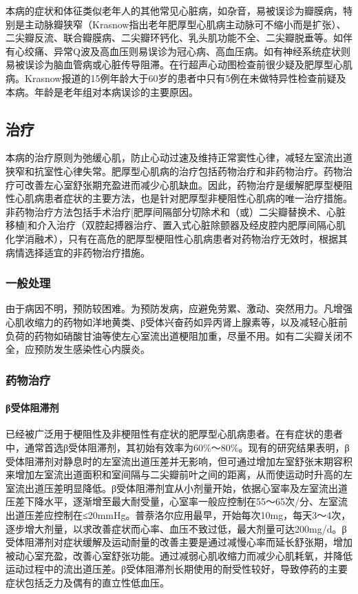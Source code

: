 本病的症状和体征类似老年人的其他常见心脏病，如杂音，易被误诊为瓣膜病，特别是主动脉瓣狭窄（Krasnow指出老年肥厚型心肌病主动脉可不缩小而是扩张）、二尖瓣反流、联合瓣膜病、二尖瓣环钙化、乳头肌功能不全、二尖瓣脱垂等。如伴有心绞痛、异常Q波及高血压则易误诊为冠心病、高血压病。如有神经系统症状则易被误诊为脑血管病或心脏传导阻滞。在行超声心动图检查前很少疑及肥厚型心肌病。Krasnow报道的15例年龄大于60岁的患者中只有5例在未做特异性检查前疑及本病。年龄是老年组对本病误诊的主要原因。

\subsection{治疗}

本病的治疗原则为弛缓心肌，防止心动过速及维持正常窦性心律，减轻左室流出道狭窄和抗室性心律失常。肥厚型心肌病的治疗包括药物治疗和非药物治疗。药物治疗可改善左心室舒张期充盈进而减少心肌缺血。因此，药物治疗是缓解肥厚型梗阻性心肌病患者症状的主要方法，也是针对肥厚型非梗阻性心肌病的唯一治疗措施。非药物治疗方法包括手术治疗{[}肥厚间隔部分切除术和（或）二尖瓣替换术、心脏移植{]}和介入治疗（双腔起搏器治疗、置入式心脏除颤器及经皮腔内肥厚间隔心肌化学消融术），只有在高危的肥厚型梗阻性心肌病患者对药物治疗无效时，根据其病情选择适宜的非药物治疗措施。

\subsubsection{一般处理}

由于病因不明，预防较困难。为预防发病，应避免劳累、激动、突然用力。凡增强心肌收缩力的药物如洋地黄类、β受体兴奋药如异丙肾上腺素等，以及减轻心脏前负荷的药物如硝酸甘油等使左心室流出道梗阻加重，尽量不用。如有二尖瓣关闭不全，应预防发生感染性心内膜炎。

\subsubsection{药物治疗}

\paragraph{β受体阻滞剂}

已经被广泛用于梗阻性及非梗阻性有症状的肥厚型心肌病患者。在有症状的患者中，通常首选β受体阻滞剂，其初始有效率为60\%～80\%。现有的研究结果表明，β受体阻滞剂对静息时的左室流出道压差并无影响，但可通过增加左室舒张末期容积来增加左室流出道面积和室间隔与二尖瓣前叶之间的距离，从而使运动时升高的左室流出道压差明显降低。β受体阻滞剂宜从小剂量开始，依据心室率及左室流出道压差下降水平，逐渐增至最大耐受量，心室率一般应控制在55～65次/分、左室流出道压差应控制在≤20mmHg。普萘洛尔应用最早，开始每次10mg，每天3～4次，逐步增大剂量，以求改善症状而心率、血压不致过低，最大剂量可达200mg/d。β受体阻滞剂对症状缓解及运动耐量的改善主要是通过减慢心率而延长舒张期，增加被动心室充盈，改善心室舒张功能。通过减弱心肌收缩力而减少心肌耗氧，并降低运动过程中的流出道压差。β受体阻滞剂长期使用的耐受性较好，导致停药的主要症状包括乏力及偶有的直立性低血压。

